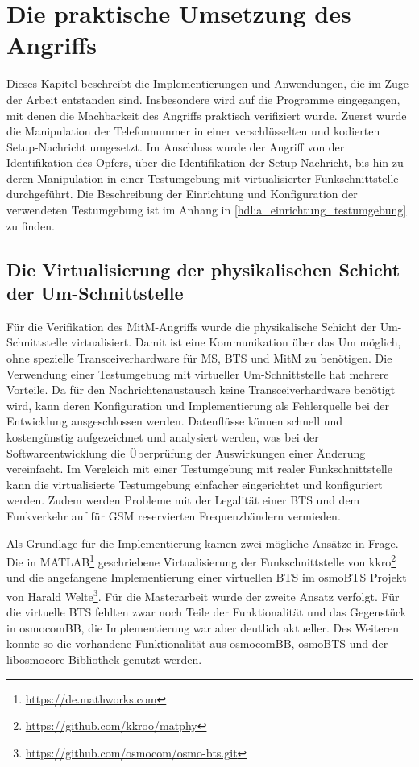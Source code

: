 \chapter{Die praktische Umsetzung des Angriffs}

Dieses Kapitel beschreibt die Implementierungen und Anwendungen, die im Zuge der Arbeit entstanden sind. Insbesondere wird auf die Programme eingegangen, mit denen die Machbarkeit des Angriffs praktisch verifiziert wurde. Zuerst wurde die Manipulation der Telefonnummer in einer verschlüsselten und kodierten Setup-Nachricht umgesetzt. Im Anschluss wurde der Angriff von der Identifikation des Opfers, über die Identifikation der Setup-Nachricht, bis hin zu deren Manipulation in einer Testumgebung mit virtualisierter Funkschnittstelle durchgeführt. Die Beschreibung der Einrichtung und Konfiguration der verwendeten Testumgebung ist im Anhang in \autoref{hdl:a_einrichtung_testumgebung} zu finden.

\section{Die Virtualisierung der physikalischen Schicht der Um-Schnittstelle}

Für die Verifikation des \ac{MitM}-Angriffs wurde die physikalische Schicht der \ac{Um}-Schnittstelle virtualisiert. Damit ist eine Kommunikation über das \ac{Um} möglich, ohne spezielle Transceiverhardware für \ac{MS}, \ac{BTS} und \ac{MitM} zu benötigen. Die Verwendung einer Testumgebung mit virtueller \ac{Um}-Schnittstelle hat mehrere Vorteile. Da für den Nachrichtenaustausch keine Transceiverhardware benötigt wird, kann deren Konfiguration und Implementierung als Fehlerquelle bei der Entwicklung ausgeschlossen werden. Datenflüsse können schnell und kostengünstig aufgezeichnet und analysiert werden, was bei der Softwareentwicklung die Überprüfung der Auswirkungen einer Änderung vereinfacht. Im Vergleich mit einer Testumgebung mit realer Funkschnittstelle kann die virtualisierte Testumgebung einfacher eingerichtet und konfiguriert werden. Zudem werden Probleme mit der Legalität einer \ac{BTS} und dem Funkverkehr auf für \ac{GSM} reservierten Frequenzbändern vermieden. 

Als Grundlage für die Implementierung kamen zwei mögliche Ansätze in Frage. Die in MATLAB\footnote{\url{https://de.mathworks.com}} geschriebene Virtualisierung der Funkschnittstelle von kkro\footnote{\url{https://github.com/kkroo/matphy}} und die angefangene Implementierung einer virtuellen \ac{BTS} im osmoBTS Projekt von Harald Welte\footnote{\url{https://github.com/osmocom/osmo-bts.git}}. Für die Masterarbeit wurde der zweite Ansatz verfolgt. Für die virtuelle \ac{BTS} fehlten zwar noch Teile der Funktionalität und das Gegenstück in osmocomBB, die Implementierung war aber deutlich aktueller. Des Weiteren konnte so die vorhandene Funktionalität aus osmocomBB, osmoBTS und der libosmocore Bibliothek genutzt werden.

